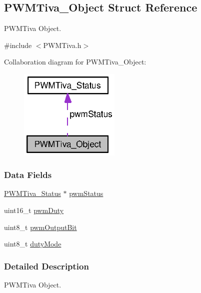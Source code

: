 \subsection{P\+W\+M\+Tiva\+\_\+\+Object Struct Reference}
\label{struct_p_w_m_tiva___object}


P\+W\+M\+Tiva Object.  




{\ttfamily \#include $<$P\+W\+M\+Tiva.\+h$>$}



Collaboration diagram for P\+W\+M\+Tiva\+\_\+\+Object\+:
\nopagebreak
\begin{figure}[H]
\begin{center}
\leavevmode
\includegraphics[width=136pt]{struct_p_w_m_tiva___object__coll__graph}
\end{center}
\end{figure}
\subsubsection*{Data Fields}
\begin{DoxyCompactItemize}
\item 
\hyperlink{struct_p_w_m_tiva___status}{P\+W\+M\+Tiva\+\_\+\+Status} $\ast$ \hyperlink{struct_p_w_m_tiva___object_ac8bd4faf595db91eed648925028a8ee2}{pwm\+Status}
\item 
uint16\+\_\+t \hyperlink{struct_p_w_m_tiva___object_a800cd6659e683499a1d10781f6dd8039}{pwm\+Duty}
\item 
uint8\+\_\+t \hyperlink{struct_p_w_m_tiva___object_a2495251d43ff49e93db61ffaf060225b}{pwm\+Output\+Bit}
\item 
uint8\+\_\+t \hyperlink{struct_p_w_m_tiva___object_a55f216f7bf6438a120a7f0b52726ad55}{duty\+Mode}
\end{DoxyCompactItemize}


\subsubsection{Detailed Description}
P\+W\+M\+Tiva Object. 

